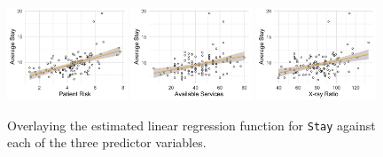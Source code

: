 \documentclass[10pt]{article}
\begin{document}
\begin{figure}[ht]
    \includegraphics[width = 0.32\textwidth]{q02_lm1.png}
    \includegraphics[width = 0.32\textwidth]{q02_lm2.png}
    \includegraphics[width = 0.32\textwidth]{q02_lm3.png}
    \caption{Overlaying the estimated linear regression function for \texttt{Stay} against each of the three predictor variables.}
    \label{q02_fig02}
\end{figure}
\end{document}
